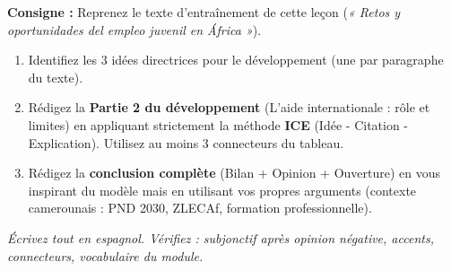\documentclass[11pt]{article}
\begin{document}
\begin{exercice}
\textbf{Consigne :} Reprenez le texte d'entraînement de cette leçon (\emph{« Retos y oportunidades del empleo juvenil en África »}).
\begin{enumerate}
    \item Identifiez les 3 idées directrices pour le développement (une par paragraphe du texte).
    \item Rédigez la \textbf{Partie 2 du développement} (L'aide internationale : rôle et limites) en appliquant strictement la méthode \textbf{ICE} (Idée - Citation - Explication). Utilisez au moins 3 connecteurs du tableau.
    \item Rédigez la \textbf{conclusion complète} (Bilan + Opinion + Ouverture) en vous inspirant du modèle mais en utilisant vos propres arguments (contexte camerounais : PND 2030, ZLECAf, formation professionnelle).
\end{enumerate}
\textit{Écrivez tout en espagnol. Vérifiez : subjonctif après opinion négative, accents, connecteurs, vocabulaire du module.}
\end{exercice}
\end{document}
